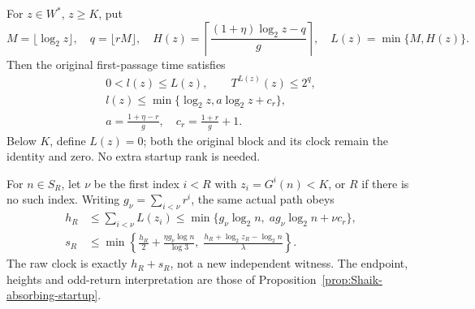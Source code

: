\begin{proposition}
\label{prop:Shaik-clipped-horizon}
For \(z\in W^*\), \(z\ge K\), put
\[
 M=\lfloor\log_2 z\rfloor,\quad q=\lfloor rM\rfloor,\quad
 H(z)=\left\lceil\frac{(1+\eta)\log_2z-q}{g}\right\rceil,\quad
 L(z)=\min\{M,H(z)\}.
\]
Then the original first-passage time satisfies
\begin{equation}\label{eq:Shaik-clipped-block}
 \begin{gathered}
 0<l(z)\le L(z),\qquad T^{L(z)}(z)\le 2^q,\\
 l(z)\le \min\{\log_2z,a\log_2z+c_r\},\\
 a=\frac{1+\eta-r}{g},\quad c_r=\frac{1+r}{g}+1 .
 \end{gathered}
\end{equation}
Below \(K\), define \(L(z)=0\); both the original block and its clock
remain the identity and zero. No extra startup rank is needed.

For \(n\in S_R\), let \(\nu\) be the first index \(i<R\) with
\(z_i=G^i(n)<K\), or \(R\) if there is no such index.
Writing \(g_\nu=\sum_{i<\nu}r^i\), the same actual path obeys
\begin{align}
 h_R&\le\sum_{i<\nu}L(z_i)
       \le\min\{g_\nu\log_2 n,\;a g_\nu\log_2 n+\nu c_r\},
       \label{eq:Shaik-clipped-sum}\\
 s_R&\le\min\left\{\frac{h_R}{2}
                +\frac{\eta g_\nu\log n}{\log3},\;
              \frac{h_R+\log_2z_R-\log_2n}{\lambda}\right\}.
       \label{eq:Shaik-clipped-odd}
\end{align}
The raw clock is exactly \(h_R+s_R\), not a new independent witness.
The endpoint, heights and odd-return interpretation are those of
Proposition~\ref{prop:Shaik-absorbing-startup}.
\end{proposition}
